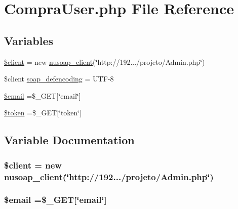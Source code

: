 \hypertarget{_compra_user_8php}{}\section{Compra\+User.\+php File Reference}
\label{_compra_user_8php}
\subsection*{Variables}
\begin{DoxyCompactItemize}
\item 
\hyperlink{_compra_user_8php_ad1405dc1ba2e288764378e79bff7a87d}{\$client} = new \hyperlink{classnusoap__client}{nusoap\+\_\+client}(\char`\"{}http\+://192.../projeto/Admin.\+php\char`\"{})
\item 
\$client \hyperlink{_compra_user_8php_a944cce1b9c1aa5e93c77ace20ce99989}{soap\+\_\+defencoding} = \textquotesingle{}U\+T\+F-\/8\textquotesingle{}
\item 
\hyperlink{_compra_user_8php_ad634f418b20382e2802f80532d76d3cd}{\$email} =\$\+\_\+\+G\+E\+T\mbox{[}\char`\"{}email\char`\"{}\mbox{]}
\item 
\hyperlink{_compra_user_8php_a00ae4fcafb1145f5e968bdf920f83e2e}{\$token} =\$\+\_\+\+G\+E\+T\mbox{[}\char`\"{}token\char`\"{}\mbox{]}
\end{DoxyCompactItemize}


\subsection{Variable Documentation}
\hypertarget{_compra_user_8php_ad1405dc1ba2e288764378e79bff7a87d}{}
\subsubsection[{\$client}]{\setlength{\rightskip}{0pt plus 5cm}\$client = new {\bf nusoap\+\_\+client}(\char`\"{}http\+://192.../projeto/Admin.\+php\char`\"{})}\label{_compra_user_8php_ad1405dc1ba2e288764378e79bff7a87d}
\hypertarget{_compra_user_8php_ad634f418b20382e2802f80532d76d3cd}{}
\subsubsection[{\$email}]{\setlength{\rightskip}{0pt plus 5cm}\$email =\$\+\_\+\+G\+E\+T\mbox{[}\char`\"{}email\char`\"{}\mbox{]}}\label{_compra_user_8php_ad634f418b20382e2802f80532d76d3cd}
\hypertarget{_compra_user_8php_a00ae4fcafb1145f5e968bdf920f83e2e}{}
